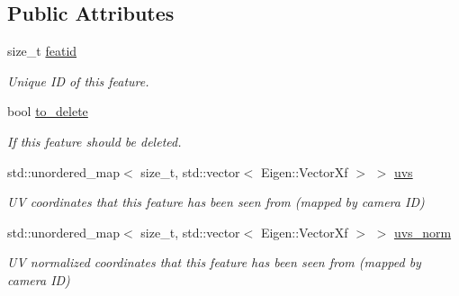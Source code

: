 \subsection*{Public Attributes}
\begin{DoxyCompactItemize}
\item 
\mbox{\label{classov__core_1_1Feature_a2d29cbda05723b3c681fca9d9c08a6b6}} 
size\+\_\+t \hyperlink{classov__core_1_1Feature_a2d29cbda05723b3c681fca9d9c08a6b6}{featid}
\begin{DoxyCompactList}\small\item\em Unique ID of this feature. \end{DoxyCompactList}\item 
\mbox{\label{classov__core_1_1Feature_afd7ba032d3f576d6cedff37326a00766}} 
bool \hyperlink{classov__core_1_1Feature_afd7ba032d3f576d6cedff37326a00766}{to\+\_\+delete}
\begin{DoxyCompactList}\small\item\em If this feature should be deleted. \end{DoxyCompactList}\item 
\mbox{\label{classov__core_1_1Feature_a0158e28d76464ab4daa4ac498270b6a0}} 
std\+::unordered\+\_\+map$<$ size\+\_\+t, std\+::vector$<$ Eigen\+::\+Vector\+Xf $>$ $>$ \hyperlink{classov__core_1_1Feature_a0158e28d76464ab4daa4ac498270b6a0}{uvs}
\begin{DoxyCompactList}\small\item\em UV coordinates that this feature has been seen from (mapped by camera ID) \end{DoxyCompactList}\item 
\mbox{\label{classov__core_1_1Feature_a9eb23faca74853073bf7625c9cdfe93f}} 
std\+::unordered\+\_\+map$<$ size\+\_\+t, std\+::vector$<$ Eigen\+::\+Vector\+Xf $>$ $>$ \hyperlink{classov__core_1_1Feature_a9eb23faca74853073bf7625c9cdfe93f}{uvs\+\_\+norm}
\begin{DoxyCompactList}\small\item\em UV normalized coordinates that this feature has been seen from (mapped by camera ID) \end{DoxyCompactList}\item 
\mbox{\label{classov__core_1_1Feature_a16de72ae07065bc81570d63ec694d743}} 

\end{DoxyCompactItemize}
